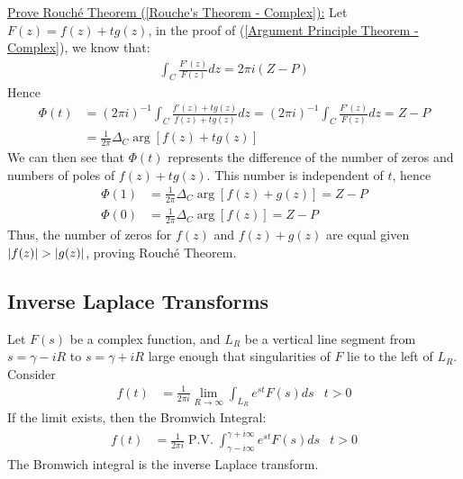 \documentclass[12pt, english]{book}
\makeatletter
\renewenvironment{proof}[1][\proofname]{\par
	\pushQED{\qed}%
	\normalfont \topsep6\p@\@plus6\p@\relax
	\list{}{%
		\settowidth{\leftmargin}{\itshape\proofname:\hskip\labelsep}%
		\setlength{\labelwidth}{0pt}%
		\setlength{\itemindent}{-\leftmargin}%
	}%
	\item[\hskip\labelsep\itshape#1\@addpunct{:}]\ignorespaces
	}{ \popQED\endlist\@endpefalse}
\makeatother
\begin{document}
\begin{example}
\begin{proof}
{			\underline{Prove Rouché Theorem (\cref{Rouche's Theorem - Complex}):} \newline
			Let \(F(z) = f(z) + tg(z)\), in the proof of (\cref{Argument Principle Theorem - Complex}), we know that:
			\begin{align*}
				\int_{C} \frac{F'(z)}{F(z)} dz = 2\pi i(Z-P)
			\end{align*}
			Hence
			\begin{align*}
				\Phi(t) 
				&= (2\pi i)^{-1} \int_{C} \frac{f'(z) + tg(z)}{f(z) + tg(z)} dz = (2\pi i)^{-1} \int_{C} \frac{F'(z)}{F(z)} dz = Z-P \\
				&= \frac{1}{2\pi} \Delta_{C} \arg[f(z) + tg(z)]
			\end{align*}
			We can then see that \(\Phi(t)\) represents the difference of the number of zeros and numbers of poles of \(f(z) + tg(z)\). This number is independent of \(t\), hence
			\begin{align*}
				\Phi(1) &= \frac{1}{2\pi} \Delta_{C} \arg[f(z) + g(z)] = Z-P \\
				\Phi(0) &= \frac{1}{2\pi} \Delta_{C} \arg[f(z)] = Z-P
			\end{align*}
			Thus, the number of zeros for \(f(z)\) and \(f(z) + g(z)\) are equal given \(\abs{f(z)} > \abs{g(z)}\), proving Rouché Theorem.
			}
		\end{proof}
	\end{example}

	\subsection{Inverse Laplace Transforms} \label{Inverse Laplace Transforms Subsection - Complex}
	
	\begin{definition}
		\label{Bromwich Integral Definition - Complex}
		Let \(F(s)\) be a complex function, and \(L_R\) be a vertical line segment from \(s = \gamma - iR\) to \(s = \gamma + iR\) large enough that singularities of \(F\) lie to the left of \(L_R\). Consider 
		\begin{align*}
			f(t) &= \frac{1}{2\pi i} \lim_{R \rightarrow \infty} \int_{L_R} e^{st} F(s) ds 
			& t>0
		\end{align*}
		If the limit exists, then the Bromwich Integral:
		\begin{align*}
			f(t) &= \frac{1}{2\pi i} \operatorname{P.V.} \int_{\gamma - i\infty}^{\gamma + i\infty} e^{st} F(s) ds 
				& t>0
		\end{align*}
		The Bromwich integral is the inverse Laplace transform.
	\end{definition}
	
\end{document}
